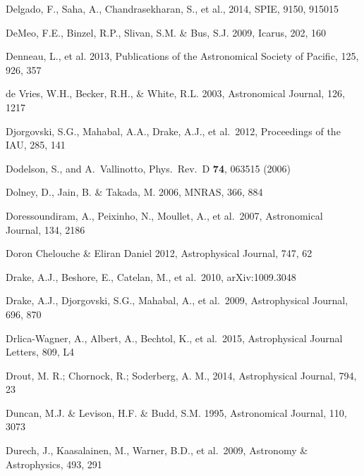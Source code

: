 \documentclass[twocolumn]{aastex61}
\begin{document}
\begin{thebibliography}{}
 Delgado, F., Saha, A., Chandrasekharan, S., et al.,  2014,  SPIE, 9150, 915015

 DeMeo, F.E., Binzel, R.P., Slivan, S.M. \& Bus, S.J. 2009, Icarus, 202, 160

 Denneau, L., et al. 2013, Publications of the Astronomical Society of Pacific, 125,  926, 357

 de Vries, W.H., Becker, R.H., \& White, R.L. 2003, Astronomical Journal, 126, 1217

 Djorgovski, S.G., Mahabal, A.A., Drake, A.J., et al.~2012, Proceedings of the IAU, 285, 141

 Dodelson, S., and A.~Vallinotto, Phys.\ Rev.\ D {\bf 74}, 063515 (2006)

 Dolney, D., Jain, B. \& Takada, M. 2006, MNRAS, 366, 884

 Doressoundiram, A., Peixinho, N., Moullet, A., et al.~2007, Astronomical Journal, 134, 2186

 Doron Chelouche \& Eliran Daniel 2012, Astrophysical Journal, 747, 62

 Drake, A.J., Beshore, E., Catelan, M., et al.~2010, arXiv:1009.3048

 Drake, A.J., Djorgovski, S.G., Mahabal, A., et al.~2009, Astrophysical Journal, 696, 870

 Drlica-Wagner, A., Albert, A., Bechtol, K., et al.\ 2015, Astrophysical Journal Letters, 809, L4

 Drout, M. R.; Chornock, R.; Soderberg, A. M., 2014, Astrophysical Journal,  794, 23

 Duncan, M.J. \& Levison, H.F. \& Budd, S.M. 1995, Astronomical Journal, 110, 3073

 Durech, J., Kaasalainen, M., Warner, B.D., et al.~2009, Astronomy \& Astrophysics, 493, 291


\end{thebibliography}
\end{document}
